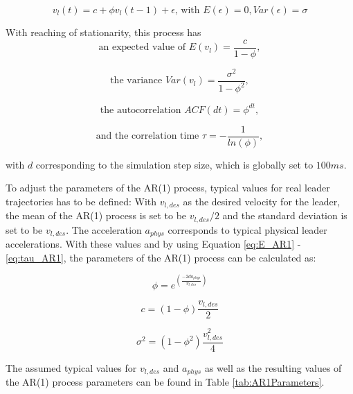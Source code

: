\documentclass[review]{elsarticle}
\begin{document}
\begin{equation}
	v_l(t) = c+\phi v_l(t-1)+ \epsilon \text{, with } E(\epsilon) = 0, Var(\epsilon) = \sigma 
\end{equation}

With reaching of stationarity, this process has 
\begin{equation}
\label{eq:E_AR1}
 \text{an expected value of }E(v_l) = \frac{c}{1-\phi}, 
 \end{equation}
 
 \begin{equation}
 \label{eq:V_AR1}
 \text{the variance  }Var(v_l) = \frac{\sigma^2}{1-\phi^2}, 
 \end{equation}

 \begin{equation}
 \label{eq:ACF_AR1}
\text{the autocorrelation  }ACF(dt) = \phi^{dt}, 
\end{equation}

 \begin{equation}
 \label{eq:tau_AR1}
\text{and the correlation time  }\tau = -\frac{1}{ln(\phi)}, 
\end{equation}

with $d$ corresponding to the simulation step size, which is globally set to $100ms$. 

To adjust the parameters of the AR(1) process, typical values for real leader trajectories has to be defined: With $v_{l,des}$ as the desired velocity for the leader, the mean of the AR(1) process is set to be $v_{l,des}/2$ and the standard deviation is set to be $v_{l,des}$. The acceleration $a_{phys}$ corresponds to typical physical leader accelerations. With these values and by using Equation \ref{eq:E_AR1} - \ref{eq:tau_AR1}, the parameters of the AR(1) process can be calculated as:

 \begin{equation}
\phi = e^{(\frac{-2da_{phys}}{v_{l,des}})}
\end{equation}

 \begin{equation}
c=(1-\phi)\frac{v_{l,des}}{2}
\end{equation}

 \begin{equation}
 \sigma^2=(1-\phi^2)\frac{v_{l,des}^2}{4}
\end{equation}

The assumed typical values for $v_{l,des}$ and  $a_{phys}$ as well as the resulting values of the AR(1) process parameters can be found in Table \ref{tab:AR1Parameters}.
\end{document}
